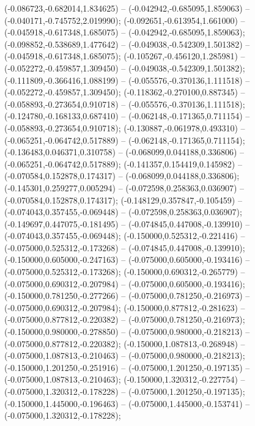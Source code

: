  (-0.086723,-0.682014,1.834625) -- (-0.042942,-0.685095,1.859063) -- (-0.040171,-0.745752,2.019990);
 (-0.092651,-0.613954,1.661000) -- (-0.045918,-0.617348,1.685075) -- (-0.042942,-0.685095,1.859063);
 (-0.098852,-0.538689,1.477642) -- (-0.049038,-0.542309,1.501382) -- (-0.045918,-0.617348,1.685075);
 (-0.105267,-0.456120,1.285981) -- (-0.052272,-0.459857,1.309450) -- (-0.049038,-0.542309,1.501382);
 (-0.111809,-0.366416,1.088199) -- (-0.055576,-0.370136,1.111518) -- (-0.052272,-0.459857,1.309450);
 (-0.118362,-0.270100,0.887345) -- (-0.058893,-0.273654,0.910718) -- (-0.055576,-0.370136,1.111518);
 (-0.124780,-0.168133,0.687410) -- (-0.062148,-0.171365,0.711154) -- (-0.058893,-0.273654,0.910718);
 (-0.130887,-0.061978,0.493310) -- (-0.065251,-0.064742,0.517889) -- (-0.062148,-0.171365,0.711154);
 (-0.136483,0.046371,0.310758) -- (-0.068099,0.044188,0.336806) -- (-0.065251,-0.064742,0.517889);
 (-0.141357,0.154419,0.145982) -- (-0.070584,0.152878,0.174317) -- (-0.068099,0.044188,0.336806);
 (-0.145301,0.259277,0.005294) -- (-0.072598,0.258363,0.036907) -- (-0.070584,0.152878,0.174317);
 (-0.148129,0.357847,-0.105459) -- (-0.074043,0.357455,-0.069448) -- (-0.072598,0.258363,0.036907);
 (-0.149697,0.447075,-0.181495) -- (-0.074845,0.447008,-0.139910) -- (-0.074043,0.357455,-0.069448);
 (-0.150000,0.525312,-0.221416) -- (-0.075000,0.525312,-0.173268) -- (-0.074845,0.447008,-0.139910);
 (-0.150000,0.605000,-0.247163) -- (-0.075000,0.605000,-0.193416) -- (-0.075000,0.525312,-0.173268);
 (-0.150000,0.690312,-0.265779) -- (-0.075000,0.690312,-0.207984) -- (-0.075000,0.605000,-0.193416);
 (-0.150000,0.781250,-0.277266) -- (-0.075000,0.781250,-0.216973) -- (-0.075000,0.690312,-0.207984);
 (-0.150000,0.877812,-0.281623) -- (-0.075000,0.877812,-0.220382) -- (-0.075000,0.781250,-0.216973);
 (-0.150000,0.980000,-0.278850) -- (-0.075000,0.980000,-0.218213) -- (-0.075000,0.877812,-0.220382);
 (-0.150000,1.087813,-0.268948) -- (-0.075000,1.087813,-0.210463) -- (-0.075000,0.980000,-0.218213);
 (-0.150000,1.201250,-0.251916) -- (-0.075000,1.201250,-0.197135) -- (-0.075000,1.087813,-0.210463);
 (-0.150000,1.320312,-0.227754) -- (-0.075000,1.320312,-0.178228) -- (-0.075000,1.201250,-0.197135);
 (-0.150000,1.445000,-0.196463) -- (-0.075000,1.445000,-0.153741) -- (-0.075000,1.320312,-0.178228);
